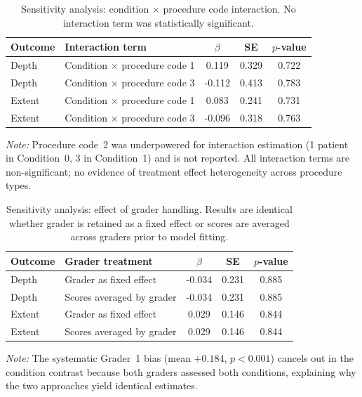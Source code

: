 \begin{table}[htbp]
\centering
\caption{Sensitivity analysis: condition $\times$ procedure code interaction. No interaction term was statistically significant.}
\label{tab:supp-interaction}
\begin{tabular}{l l S[table-format=-1.3] S[table-format=1.3] S[table-format=1.3]}
\toprule
{Outcome} & {Interaction term} & {$\beta$} & {SE} & {$p$-value} \\
\midrule
Depth  & Condition $\times$ procedure code 1 &  0.119 & 0.329 & 0.722 \\
Depth  & Condition $\times$ procedure code 3 & -0.112 & 0.413 & 0.783 \\
Extent & Condition $\times$ procedure code 1 &  0.083 & 0.241 & 0.731 \\
Extent & Condition $\times$ procedure code 3 & -0.096 & 0.318 & 0.763 \\
\bottomrule
\end{tabular}
\smallskip

\noindent\textit{Note:} Procedure code~2 was underpowered for interaction estimation (1 patient in Condition~0, 3 in Condition~1) and is not reported. All interaction terms are non-significant; no evidence of treatment effect heterogeneity across procedure types.
\end{table}

\begin{table}[htbp]
\centering
\caption{Sensitivity analysis: effect of grader handling. Results are identical whether grader is retained as a fixed effect or scores are averaged across graders prior to model fitting.}
\label{tab:supp-grader}
\begin{tabular}{l l S[table-format=-1.3] S[table-format=1.3] S[table-format=1.3]}
\toprule
{Outcome} & {Grader treatment} & {$\beta$} & {SE} & {$p$-value} \\
\midrule
Depth  & Grader as fixed effect    & -0.034 & 0.231 & 0.885 \\
Depth  & Scores averaged by grader & -0.034 & 0.231 & 0.885 \\
Extent & Grader as fixed effect    &  0.029 & 0.146 & 0.844 \\
Extent & Scores averaged by grader &  0.029 & 0.146 & 0.844 \\
\bottomrule
\end{tabular}
\smallskip

\noindent\textit{Note:} The systematic Grader~1 bias (mean $+0.184$, $p < 0.001$) cancels out in the condition contrast because both graders assessed both conditions, explaining why the two approaches yield identical estimates.
\end{table}

